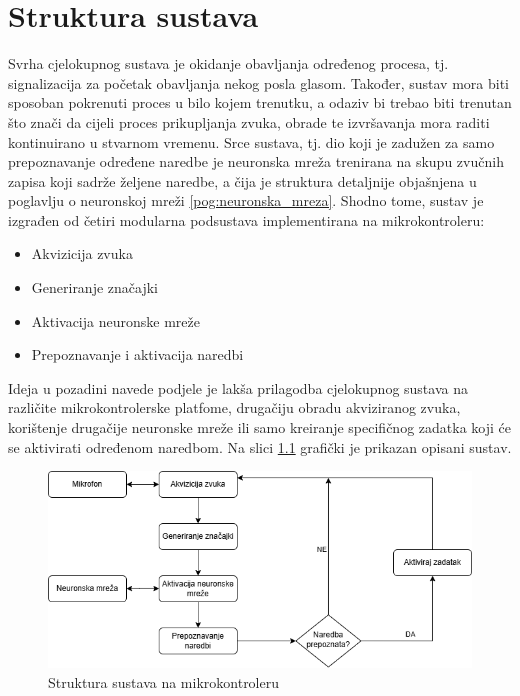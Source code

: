 \chapter{Struktura sustava}
\label{pog:struktura_sustava}

Svrha cjelokupnog sustava je okidanje obavljanja određenog procesa, tj. signalizacija
za početak obavljanja nekog posla glasom. Također, sustav mora biti sposoban pokrenuti
proces u bilo kojem trenutku, a odaziv bi trebao biti trenutan što
znači da cijeli proces prikupljanja zvuka, obrade te izvršavanja mora raditi
kontinuirano u stvarnom vremenu. Srce sustava, tj. dio koji je zadužen za
samo prepoznavanje određene naredbe je neuronska
mreža trenirana na skupu zvučnih zapisa koji sadrže željene naredbe, a čija je struktura
detaljnije objašnjena u poglavlju o neuronskoj mreži \ref{pog:neuronska_mreza}.
Shodno tome, sustav je izgrađen od četiri modularna
podsustava implementirana na mikrokontroleru:

\begin{itemize}
    \item Akvizicija zvuka
    \item Generiranje značajki
    \item Aktivacija neuronske mreže
    \item Prepoznavanje i aktivacija naredbi
\end{itemize}

Ideja u pozadini navede podjele je lakša prilagodba cjelokupnog
sustava na različite mikrokontrolerske platfome, drugačiju obradu
akviziranog zvuka, korištenje drugačije neuronske mreže ili samo 
kreiranje specifičnog zadatka koji će se aktivirati određenom naredbom.
Na slici \ref{pic:struktura_sustava} grafički je prikazan opisani sustav.

\begin{figure}[htb]
    \centering
    \includegraphics[width=1\linewidth]{Chapters/struktura_sustava/struktura_sustava.png} 
    \caption{Struktura sustava na mikrokontroleru\cite{flowchart}}
    \label{pic:struktura_sustava}
\end{figure}






